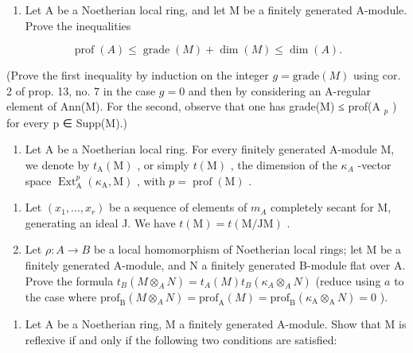 \begin{enumerate}
\def\labelenumi{\arabic{enumi})}
\setcounter{enumi}{14}
\tightlist
\item
  Let A be a Noetherian local ring, and let M be a finitely generated A-module. Prove the inequalities
\end{enumerate}

\[
\operatorname{prof} (A) \leqslant \operatorname{grade} (M) + \dim (M) \leqslant \dim (A).
\]

(Prove the first inequality by induction on the integer \(g = \text{grade}(M)\) using cor. 2 of prop. 13, no. 7 in the case \(g = 0\) and then by considering an A-regular element of Ann(M). For the second, observe that one has grade(M) ≤ prof(A \(_{p}\) ) for every p ∈ Supp(M).)

\begin{enumerate}
\def\labelenumi{\arabic{enumi})}
\setcounter{enumi}{15}
\tightlist
\item
  Let A be a Noetherian local ring. For every finitely generated A-module M, we denote by \(t_{\mathrm{A}}(\mathrm{M})\) , or simply \(t(\mathrm{M})\) , the dimension of the \(\kappa_{A}\) -vector space \(\operatorname{Ext}_{\mathrm{A}}^{p}(\kappa_{\mathrm{A}},\mathrm{M})\) , with \(p=\operatorname{prof}(\mathrm{M})\) .
\end{enumerate}

\begin{enumerate}
\def\labelenumi{\alph{enumi})}
\item
  Let \((x_{1},\ldots,x_{r})\) be a sequence of elements of \(m_{A}\) completely secant for M, generating an ideal J. We have \(t(\mathrm{M})=t(\mathrm{M}/\mathrm{JM})\) .
\item
  Let \(\rho : A \to B\) be a local homomorphism of Noetherian local rings; let M be a finitely generated A-module, and N a finitely generated B-module flat over A. Prove the formula \(t_{B}(M \otimes_{A} N) = t_{A}(M)t_{B}(\kappa_{A} \otimes_{A} N)\) (reduce using \(a\) to the case where \(\mathrm{prof}_{\mathrm{B}}(M \otimes_{A} N) = \mathrm{prof}_{\mathrm{A}}(M) = \mathrm{prof}_{\mathrm{B}}(\kappa_{\mathrm{A}} \otimes_{\mathrm{A}} N) = 0\) ).
\end{enumerate}

\begin{enumerate}
\def\labelenumi{\arabic{enumi})}
\setcounter{enumi}{16}
\tightlist
\item
  Let A be a Noetherian ring, M a finitely generated A-module. Show that M is reflexive if and only if the following two conditions are satisfied:
\end{enumerate}

